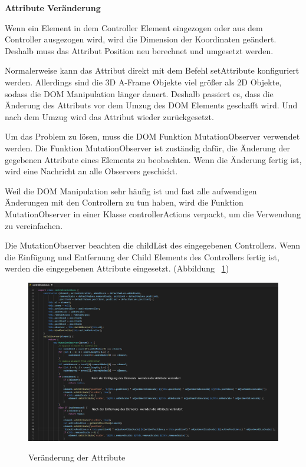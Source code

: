   \textbf{Attribute Veränderung}
  
  Wenn ein Element in dem Controller Element eingezogen oder aus dem Controller ausgezogen wird, wird die Dimension der Koordinaten geändert. Deshalb muss das Attribut Position neu berechnet und umgesetzt werden.
  
  Normalerweise kann das Attribut direkt mit dem Befehl {\selectfont setAttribute} konfiguriert werden. Allerdings sind die 3D A-Frame Objekte viel größer als 2D Objekte, sodass die DOM Manipulation länger dauert. Deshalb passiert es, dass die Änderung des Attributs vor dem Umzug des DOM Elements geschafft wird. Und nach dem Umzug wird das Attribut wieder zurückgesetzt.
  
  Um das Problem zu lösen, muss die DOM Funktion {\selectfont MutationObserver} verwendet werden. Die Funktion {\selectfont MutationObserver} ist zuständig dafür, die Änderung der gegebenen Attribute eines Elements zu beobachten. Wenn die Änderung fertig ist, wird eine Nachricht an alle Observers geschickt.
  
  Weil die DOM Manipulation sehr häufig ist und fast alle aufwendigen Änderungen mit den Controllern zu tun haben, wird die Funktion {\selectfont MutationObserver} in einer Klasse {\selectfont controllerActions} verpackt, um die Verwendung zu vereinfachen.
  
  Die {\selectfont MutationObserver} beachten die {\selectfont childList} des eingegebenen Controllers. Wenn die Einfügung und Entfernung der Child Elements des Controllers fertig ist, werden die eingegebenen Attribute eingesetzt. (Abbildung ~\ref{fig:controllerAction})
  
\begin{figure}[ht]
\vspace*{1em}
\centering
\caption[Veränderung der Attribute]{Veränderung der Attribute}
\includegraphics[width=\textwidth]{images/controllerAction.png}
\label{fig:controllerAction} 
\end{figure}
  

